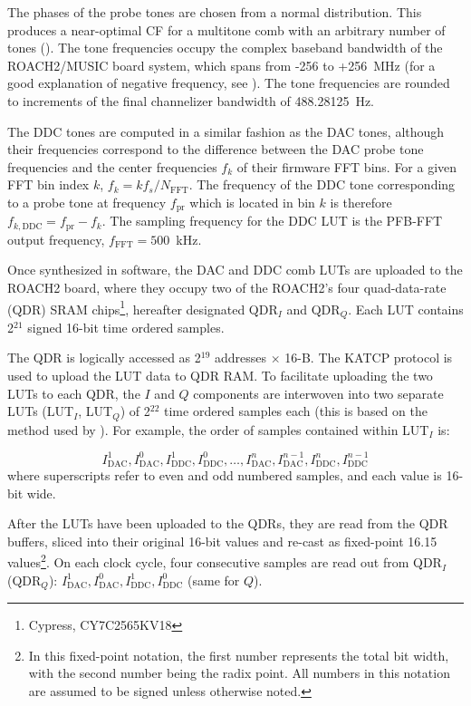 The phases of the probe tones are chosen from a normal distribution. This produces a near-optimal CF for a multitone comb with an arbitrary number of tones (\citet{boyd1986multitone}). The tone frequencies occupy the complex baseband bandwidth of the ROACH2/MUSIC board system, which spans from -256 to +256~MHz (for a good explanation of negative frequency, see \citet{lyons2004understanding}). The tone frequencies are rounded to increments of the final channelizer bandwidth of 488.28125~Hz.

The DDC tones are computed in a similar fashion as the DAC tones, although their frequencies correspond to the difference between the DAC probe tone frequencies and the center frequencies $f_{k}$ of their firmware FFT bins. For a given FFT bin index $k$, $f_{k} = kf_{s}/N_{\mathrm{FFT}}$. The frequency of the DDC tone corresponding to a probe tone at frequency $f_{\mathrm{pr}}$ which is located in bin $k$ is therefore $f_{k,\mathrm{DDC}} = f_{\mathrm{pr}} - f_{k}$. The sampling frequency for the DDC LUT is the PFB-FFT output frequency, $f_{\mathrm{FFT}} = 500$~kHz.

Once synthesized in software, the DAC and DDC comb LUTs are uploaded to the ROACH2 board, where they occupy two of the ROACH2's four quad-data-rate (QDR) SRAM chips\footnote{Cypress, CY7C2565KV18}, hereafter designated QDR$_{I}$ and QDR$ _{Q}$. Each LUT contains 2$^{21}$ signed 16-bit time ordered samples.

The QDR is logically accessed as 2$^{19}$ addresses $\times$ 16-B. The KATCP protocol is used to upload the LUT data to QDR RAM\@. To facilitate uploading the two LUTs to each QDR, the $I$ and $Q$ components are interwoven into two separate LUTs (LUT$_{I}$, LUT$_{Q}$) of 2$^{22}$ time ordered samples each (this is based on the method used by \citet{mchugh2012readout}). For example, the order of samples contained within LUT$_{I}$ is:

\begin{equation} I_{\mathrm{DAC}}^{1}, I_{\mathrm{DAC}}^{0}, I_{\mathrm{DDC}}^{1},I_{\mathrm{DDC}}^{0}, \ldots , I_{\mathrm{DAC}}^{n}, I_{\mathrm{DAC}}^{n - 1 }, I_{\mathrm{DDC}}^{n}, I_{\mathrm{DDC}}^{n - 1} \end{equation}
where superscripts refer to even and odd numbered samples, and each value is 16-bit wide.

After the LUTs have been uploaded to the QDRs, they are read from the QDR buffers, sliced into their original 16-bit values and re-cast as fixed-point 16.15 values\footnote{In this fixed-point notation, the first number represents the total bit width, with the second number being the radix point. All numbers in this notation are assumed to be signed unless otherwise noted.}. On each clock cycle, four consecutive samples are read out from QDR$_{I}$ (QDR$_{Q}$): $I_{\mathrm{DAC}}^{1}, I_{\mathrm{DAC}}^{0}, I_{\mathrm{DDC}}^{1}, I_{\mathrm{DDC}}^{0}$ (same for $Q$).

